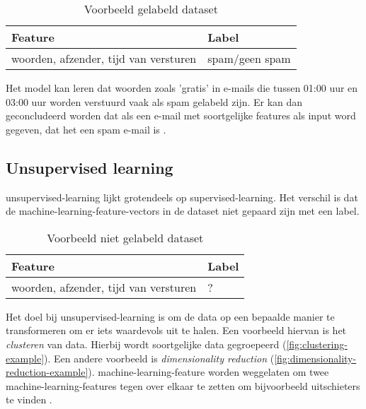 \begin{table}[hbt!]
  \centering
  \begin{tabular}{|l|l|}
  \hline
  \textbf{Feature} & \textbf{Label} \\ \hline
  woorden, afzender, tijd van versturen&spam/geen spam\\ \hline
  \end{tabular}
  \caption{Voorbeeld gelabeld dataset}
  \label{table:voorbeeld-gelabeld-dataset}
\end{table}

Het model kan leren dat woorden zoals 'gratis' in e-mails die tussen 01:00 uur en 03:00 uur worden verstuurd vaak als spam gelabeld zijn. Er kan dan geconcludeerd worden dat als een e-mail met soortgelijke features als input word gegeven, dat het een spam e-mail is \cite{google-ml-terminology}.

\subsection{Unsupervised learning}\label{subsec:unsupervised-learning}
\Gls{unsupervised-learning} lijkt grotendeels op \gls{supervised-learning}. Het verschil is dat de \glspl{machine-learning-feature-vector} in de dataset niet gepaard zijn met een label. 

\begin{table}[hbt!]
  \centering
  \begin{tabular}{|l|l|}
  \hline
  \textbf{Feature} & \textbf{Label} \\ \hline
  woorden, afzender, tijd van versturen&?\\ \hline
  \end{tabular}
  \caption{Voorbeeld niet gelabeld dataset}
  \label{table:voorbeeld-niet-gelabeld-dataset}
\end{table}

Het doel bij \gls{unsupervised-learning} is om de data op een bepaalde manier te transformeren om er iets waardevols uit te halen. Een voorbeeld hiervan is het \textit{clusteren} van data. Hierbij wordt soortgelijke data gegroepeerd (\autoref{fig:clustering-example}). Een andere voorbeeld is \textit{dimensionality reduction} (\autoref{fig:dimensionality-reduction-example}). \Gls{machine-learning-feature} worden weggelaten om twee \glspl{machine-learning-feature} tegen over elkaar te zetten om bijvoorbeeld uitschieters te vinden \cite{the-hundred-page-machine-learning-book}.


